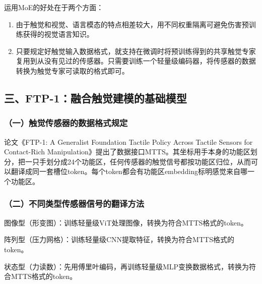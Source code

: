 运用MoE的好处在于两个方面：

\begin{enumerate}
\def\labelenumi{\arabic{enumi}.}
\item
  由于触觉和视觉、语言模态的特点相差较大，用不同权重隔离可避免伤害预训练获得的视觉语言知识。
\item
  只要规定好触觉输入数据格式，就支持在微调时将预训练得到的共享触觉专家复用到从没有见过的传感器。只需要训练一个轻量级编码器，将传感器的数据转换为触觉专家可读取的格式即可。
\end{enumerate}

\hypertarget{ux4e09ftp-1ux878dux5408ux89e6ux89c9ux5efaux6a21ux7684ux57faux7840ux6a21ux578b}{%
\subsection{三、FTP-1：融合触觉建模的基础模型}\label{ux4e09ftp-1ux878dux5408ux89e6ux89c9ux5efaux6a21ux7684ux57faux7840ux6a21ux578b}}

\hypertarget{ux4e00ux89e6ux89c9ux4f20ux611fux5668ux7684ux6570ux636eux683cux5f0fux89c4ux5b9a}{%
\subsubsection{（一）触觉传感器的数据格式规定}\label{ux4e00ux89e6ux89c9ux4f20ux611fux5668ux7684ux6570ux636eux683cux5f0fux89c4ux5b9a}}

论文《FTP-1: A Generalist Foundation Tactile Policy Across Tactile Sensors for Contact-Rich Manipulation》提出了数据接口MTTS。其坐标用手本身的功能区划分，把一只手划分成24个功能区，任何传感器的触觉信号都按功能区归位，从而可以翻译成同一套槽位token。每个token都会有功能区embedding标明感觉来自哪一个功能区。

\hypertarget{ux4e8cux4e0dux540cux7c7bux578bux4f20ux611fux5668ux4fe1ux53f7ux7684ux7ffbux8bd1ux65b9ux6cd5}{%
\subsubsection{（二）不同类型传感器信号的翻译方法}\label{ux4e8cux4e0dux540cux7c7bux578bux4f20ux611fux5668ux4fe1ux53f7ux7684ux7ffbux8bd1ux65b9ux6cd5}}

图像型（形变图）：训练轻量级ViT处理图像，转换为符合MTTS格式的token。

阵列型（压力网格）：训练轻量级CNN提取特征，转换为符合MTTS格式的token。

状态型（力读数）：先用傅里叶编码，再训练轻量级MLP变换数据格式，转换为符合MTTS格式的token。

